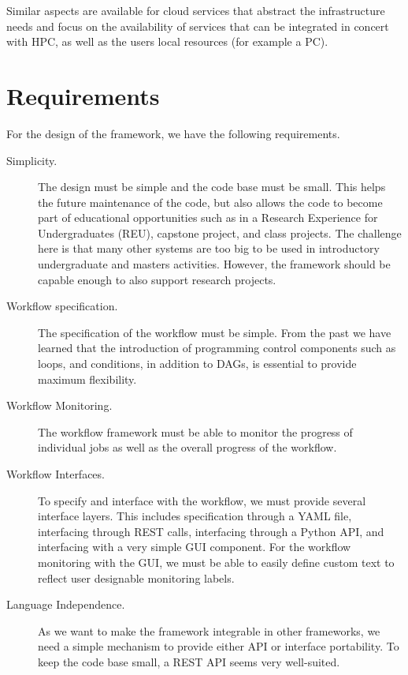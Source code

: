 Similar aspects are available for cloud services that abstract the
infrastructure needs and focus on the availability of services that
can be integrated in concert with HPC, as well as the users local
resources (for example a PC).




% 


\section{Requirements}

For the design of the framework, we have the following requirements.

\begin{description}

\item[Simplicity.] The design must be simple and the code base must be
small.  This helps the future maintenance of the code, but also allows
the code to become part of educational opportunities such as in a
Research Experience for Undergraduates (REU), capstone project, and
class projects. The challenge here is that many other systems are too
big to be used in introductory undergraduate and masters activities.
However, the framework should be capable enough to also support
research projects.

\item[Workflow specification.] The specification of the workflow must
be simple.  From the past we have learned that the introduction of
programming control components such as loops, and conditions, in
addition to DAGs, is essential to provide maximum flexibility.

\item[Workflow Monitoring.] The workflow framework must be able to
monitor the progress of individual jobs as well as the overall
progress of the workflow.

\item[Workflow Interfaces.] To specify and interface with the
workflow, we must provide several interface layers. This includes
specification through a YAML file, interfacing through REST calls,
interfacing through a Python API, and interfacing with a very simple
GUI component.  For the workflow monitoring with the GUI, we must be
able to easily define custom text to reflect user designable
monitoring labels.

\item[Language Independence.] As we want to make the framework
integrable in other frameworks, we need a simple mechanism to provide
either API or interface portability. To keep the code base small, a
REST API seems very well-suited.


\end{description}
